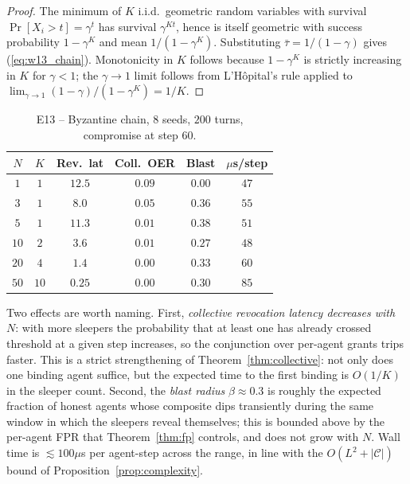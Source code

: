 \documentclass[sigconf,anonymous]{acmart}
\theoremstyle{plain}
\theoremstyle{definition}
\theoremstyle{remark}
\begin{document}
\begin{proof}
The minimum of $K$ i.i.d.\ geometric random variables with survival
$\Pr[X_i>t]=\gamma^t$ has survival $\gamma^{Kt}$, hence is itself
geometric with success probability $1-\gamma^K$ and mean
$1/(1-\gamma^K)$.  Substituting $\bar\tau=1/(1-\gamma)$ gives
(\ref{eq:w13_chain}).  Monotonicity in $K$ follows because
$1-\gamma^K$ is strictly increasing in $K$ for $\gamma<1$; the
$\gamma\to 1$ limit follows from L'H\^opital's rule applied to
$\lim_{\gamma\to 1}(1-\gamma)/(1-\gamma^K)=1/K$.
\end{proof}

\begin{table}[h]
\caption{E13 -- Byzantine chain, $8$ seeds, $200$ turns, compromise at
step $60$.}
\label{tab:w13}
\centering\footnotesize\renewcommand{\arraystretch}{1.22}
\begin{tabular}{c c c c c c}
\toprule
\rowcolor{headrow}
{\color{white}\textbf{$N$}} & {\color{white}\textbf{$K$}} &
{\color{white}\textbf{Rev.\ lat}} & {\color{white}\textbf{Coll.\ OER}} &
{\color{white}\textbf{Blast}} & {\color{white}\textbf{$\mu$s/step}}\\
\midrule
$1$  & $1$  & $12.5$ & $0.09$ & $0.00$ & $47$\\
\rowcolor{oursrow}
$3$  & $1$  & $8.0$  & $0.05$ & $0.36$ & $55$\\
$5$  & $1$  & $11.3$ & $0.01$ & $0.38$ & $51$\\
\rowcolor{oursrow}
$10$ & $2$  & $3.6$  & $0.01$ & $0.27$ & $48$\\
$20$ & $4$  & $1.4$  & $0.00$ & $0.33$ & $60$\\
\rowcolor{oursrow}
$50$ & $10$ & $0.25$ & $0.00$ & $0.30$ & $85$\\
\bottomrule
\end{tabular}
\end{table}

Two effects are worth naming.  First, \emph{collective revocation
latency decreases with $N$}: with more sleepers the probability that at
least one has already crossed threshold at a given step increases, so
the conjunction over per-agent grants trips faster.  This is a strict
strengthening of Theorem~\ref{thm:collective}: not only does one binding
agent suffice, but the expected time to the first binding is $O(1/K)$
in the sleeper count.  Second, the \emph{blast radius}
$\beta\approx 0.3$ is roughly the expected fraction of honest agents
whose composite dips transiently during the same window in which the
sleepers reveal themselves; this is bounded above by the per-agent FPR
that Theorem~\ref{thm:fp} controls, and does not grow with $N$.  Wall
time is $\lesssim 100\mu$s per agent-step across the range, in line
with the $O(L^2+|\mathcal{C}|)$ bound of
Proposition~\ref{prop:complexity}.
\end{document}

